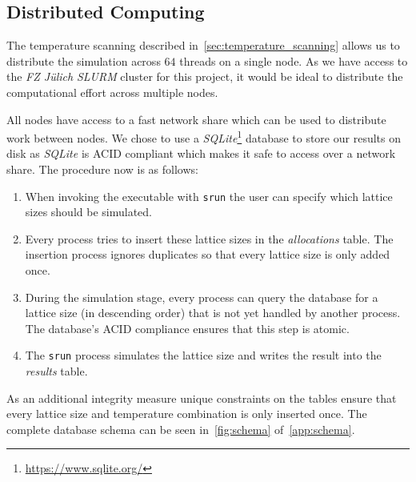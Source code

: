 \subsection{Distributed Computing}\label{sec:distributed_computing}
The temperature scanning described in~\cref{sec:temperature_scanning} allows us to distribute the simulation across $64$ threads on a single node. As we have access to the \emph{FZ Jülich} \emph{SLURM} cluster for this project, it would be ideal to distribute the computational effort across multiple nodes.

All nodes have access to a fast network share which can be used to distribute work between nodes. We chose to use a \emph{SQLite}\footnote{\url{https://www.sqlite.org/}} database to store our results on disk as \emph{SQLite} is ACID compliant which makes it safe to access over a network share. The procedure now is as follows:
\begin{enumerate}
	\item When invoking the executable with \texttt{srun} the user can specify which lattice sizes should be simulated.
	\item Every process tries to insert these lattice sizes in the \textit{allocations} table. The insertion process ignores duplicates so that every lattice size is only added once.
	\item During the simulation stage, every process can query the database for a lattice size (in descending order) that is not yet handled by another process. The database's ACID compliance ensures that this step is atomic.
	\item The \texttt{srun} process simulates the lattice size and writes the result into the \textit{results} table.
\end{enumerate}
As an additional integrity measure unique constraints on the tables ensure that every lattice size and temperature combination is only inserted once. The complete database schema can be seen in~\cref{fig:schema} of~\cref{app:schema}.

